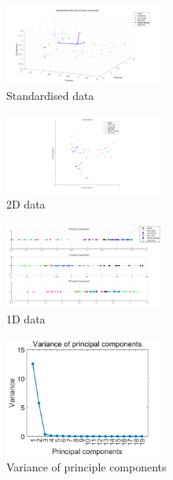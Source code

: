 \documentclass[10pt,twocolumn,letterpaper]{article}
\begin{document}
\begin{figure}[h]
\begin{center}
   \includegraphics[width=0.47\textwidth]{sec2_part1b}
\end{center}
   \caption{Standardised data}
\label{fig:12}
\end{figure}

\begin{figure}[h]
\begin{center}
   \includegraphics[width=0.47\textwidth]{sec2_part1c}
\end{center}
   \caption{2D data}
\label{fig:13}
\end{figure}

\begin{figure}[h]
\begin{center}
   \includegraphics[width=0.47\textwidth]{sec2_part1d}
\end{center}
   \caption{1D data}
\label{fig:14}
\end{figure}

\begin{figure}[h]
\begin{center}
   \includegraphics[width=0.47\textwidth]{sec2_part2a}
\end{center}
   \caption{Variance of principle components}
\label{fig:15}
\end{figure}
\end{document}
